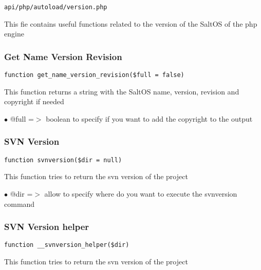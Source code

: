 \documentclass[a4paper]{article}
\begin{document}
\begin{lstlisting}
api/php/autoload/version.php
\end{lstlisting}

This fie contains useful functions related to the version of the SaltOS of the php engine

\hypertarget{toc268}{}
\subsubsection{Get Name Version Revision}

\begin{lstlisting}
function get_name_version_revision($full = false)
\end{lstlisting}

This function returns a string with the SaltOS name, version, revision and
copyright if needed

\begin{compactitem}
\item[\color{myblue}$\bullet$] @full =$>$ boolean to specify if you want to add the copyright to the output
\end{compactitem}

\hypertarget{toc269}{}
\subsubsection{SVN Version}

\begin{lstlisting}
function svnversion($dir = null)
\end{lstlisting}

This function tries to return the svn version of the project

\begin{compactitem}
\item[\color{myblue}$\bullet$] @dir =$>$ allow to specify where do you want to execute the svnversion command
\end{compactitem}

\hypertarget{toc270}{}
\subsubsection{SVN Version helper}

\begin{lstlisting}
function __svnversion_helper($dir)
\end{lstlisting}

This function tries to return the svn version of the project
\end{document}
